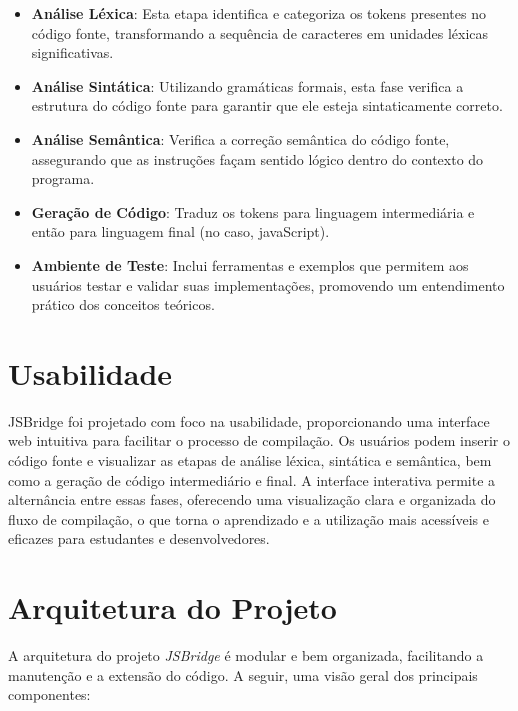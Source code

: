 \documentclass[a4paper,12pt]{article}
\begin{document}
\begin{itemize}
\item \textbf{Análise Léxica}: Esta etapa identifica e categoriza os tokens presentes no código fonte, transformando a sequência de caracteres em unidades léxicas significativas.
\item \textbf{Análise Sintática}: Utilizando gramáticas formais, esta fase verifica a estrutura do código fonte para garantir que ele esteja sintaticamente correto.
\item \textbf{Análise Semântica}: Verifica a correção semântica do código fonte, assegurando que as instruções façam sentido lógico dentro do contexto do programa.
\item \textbf{Geração de Código}: Traduz os tokens para linguagem intermediária e então para linguagem final (no caso, javaScript).
\item \textbf{Ambiente de Teste}: Inclui ferramentas e exemplos que permitem aos usuários testar e validar suas implementações, promovendo um entendimento prático dos conceitos teóricos.
\end{itemize}

\section{Usabilidade}

JSBridge foi projetado com foco na usabilidade, proporcionando uma interface web intuitiva para facilitar o processo de compilação. Os usuários podem inserir o código fonte e visualizar as etapas de análise léxica, sintática e semântica, bem como a geração de código intermediário e final. A interface interativa permite a alternância entre essas fases, oferecendo uma visualização clara e organizada do fluxo de compilação, o que torna o aprendizado e a utilização mais acessíveis e eficazes para estudantes e desenvolvedores.

\section{Arquitetura do Projeto}

A arquitetura do projeto \textit{JSBridge} é modular e bem organizada, facilitando a manutenção e a extensão do código. A seguir, uma visão geral dos principais componentes:
\end{document}
